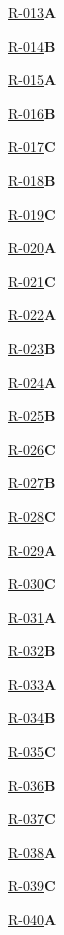 \noindent\hyperref[q:R-013]{R-013}\hfill\textbf{A}\par
\noindent\hyperref[q:R-014]{R-014}\hfill\textbf{B}\par
\noindent\hyperref[q:R-015]{R-015}\hfill\textbf{A}\par
\noindent\hyperref[q:R-016]{R-016}\hfill\textbf{B}\par
\noindent\hyperref[q:R-017]{R-017}\hfill\textbf{C}\par
\noindent\hyperref[q:R-018]{R-018}\hfill\textbf{B}\par
\noindent\hyperref[q:R-019]{R-019}\hfill\textbf{C}\par
\noindent\hyperref[q:R-020]{R-020}\hfill\textbf{A}\par
\noindent\hyperref[q:R-021]{R-021}\hfill\textbf{C}\par
\noindent\hyperref[q:R-022]{R-022}\hfill\textbf{A}\par
\noindent\hyperref[q:R-023]{R-023}\hfill\textbf{B}\par
\noindent\hyperref[q:R-024]{R-024}\hfill\textbf{A}\par
\noindent\hyperref[q:R-025]{R-025}\hfill\textbf{B}\par
\noindent\hyperref[q:R-026]{R-026}\hfill\textbf{C}\par
\noindent\hyperref[q:R-027]{R-027}\hfill\textbf{B}\par
\noindent\hyperref[q:R-028]{R-028}\hfill\textbf{C}\par
\noindent\hyperref[q:R-029]{R-029}\hfill\textbf{A}\par
\noindent\hyperref[q:R-030]{R-030}\hfill\textbf{C}\par
\noindent\hyperref[q:R-031]{R-031}\hfill\textbf{A}\par
\noindent\hyperref[q:R-032]{R-032}\hfill\textbf{B}\par
\noindent\hyperref[q:R-033]{R-033}\hfill\textbf{A}\par
\noindent\hyperref[q:R-034]{R-034}\hfill\textbf{B}\par
\noindent\hyperref[q:R-035]{R-035}\hfill\textbf{C}\par
\noindent\hyperref[q:R-036]{R-036}\hfill\textbf{B}\par
\noindent\hyperref[q:R-037]{R-037}\hfill\textbf{C}\par
\noindent\hyperref[q:R-038]{R-038}\hfill\textbf{A}\par
\noindent\hyperref[q:R-039]{R-039}\hfill\textbf{C}\par
\noindent\hyperref[q:R-040]{R-040}\hfill\textbf{A}\par
